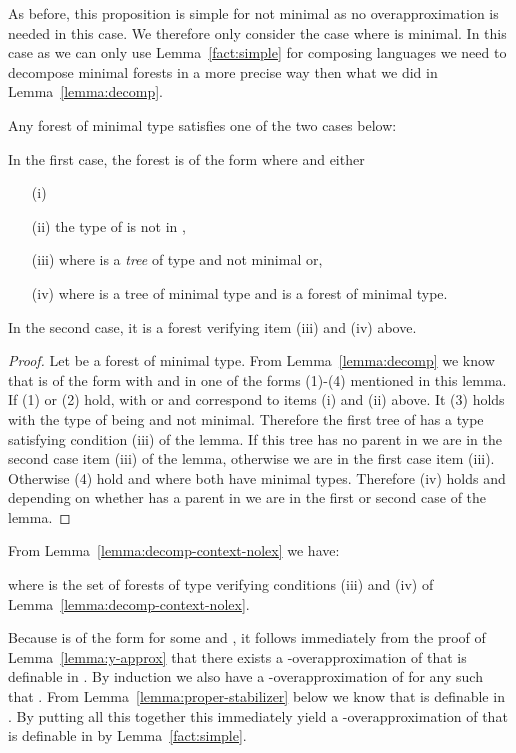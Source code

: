 \documentclass{LMCS}
\begin{document}
{As before, this proposition is simple for  not minimal as no
overapproximation is needed in this case. We therefore only consider the case
where  is minimal. In this case as we can only use Lemma~\ref{fact:simple}
for composing languages we need to decompose minimal forests in a more precise
way then what we did in Lemma~\ref{lemma:decomp}.

\begin{lem}\label{lemma:decomp-context-nolex}
Any forest of minimal type satisfies one of the two cases below:

\noindent
In the first case, the forest is of the form  where  and either
\begin{enumerate}
 \item [(i)] 
 \item [(ii)] the type of  is not in ,
 \item [(iii)]  where  is a \emph{tree} of type  and  not minimal or,
 \item [(iv)]  where  is a tree of minimal type and  is a forest
   of minimal type.
\end{enumerate}

\noindent
In the second case, it is a forest  verifying item (iii) and (iv) above.
\end{lem}
\begin{proof}
  Let  be a forest of minimal type. From Lemma~\ref{lemma:decomp} we know
  that  is of the form  with  and  in one of the forms
  (1)-(4) mentioned in this lemma. If (1) or (2) hold,  with  or
   and correspond to items (i) and (ii) above. It (3) holds
   with the type of  being  and  not
  minimal. Therefore the first tree of  has a type satisfying condition
  (iii) of the lemma. If this tree has no parent in  we are in the second
  case item (iii) of the lemma, otherwise we are in the first case item (iii).
  Otherwise (4) hold and  where both have minimal types. Therefore
  (iv) holds and depending on whether  has a parent in  we are in the
  first or second case of the lemma.
\end{proof}

From Lemma~\ref{lemma:decomp-context-nolex} we have:



where  is the set of forests of type  verifying conditions (iii) and
(iv) of Lemma~\ref{lemma:decomp-context-nolex}.

\noindent
Because  is of the form  for some  and , it follows
immediately from the proof of Lemma~\ref{lemma:y-approx} that there exists a
-overapproximation  of  that is definable in \Stwo. By
induction we also have a -overapproximation  of  for any
 such that . From Lemma~\ref{lemma:proper-stabilizer}
below we know that  is definable in \Stwo. By putting all this together
this immediately yield a -overapproximation of  that is definable in
\Stwo by Lemma~\ref{fact:simple}.

}
\end{document}
